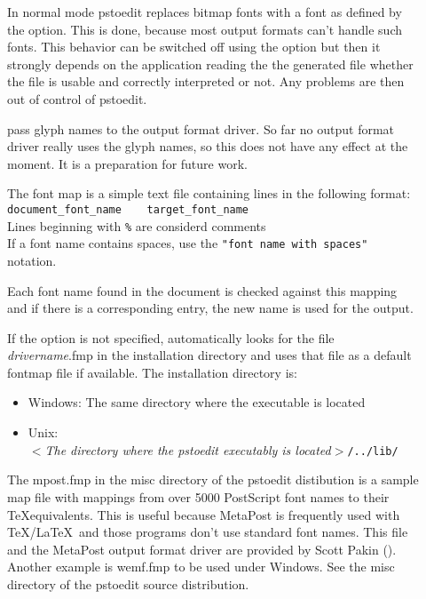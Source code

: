 \documentclass[english,a4paper]{article}
\begin{document}
\begin{description}
\item[] 
In normal mode pstoedit replaces bitmap fonts with a font as defined by the  option. This is done, because most output formats can't handle such fonts. This behavior can be switched off using the  option but then it strongly depends on the application reading the the generated file whether the file is usable and correctly interpreted or not. Any problems are then out of control of pstoedit.


\item[] 
pass glyph names to the output format driver. So far no output format driver really uses the glyph names, so this does not have any effect at the moment. It is a preparation for future work.


\item[] 
The font map is a simple text file containing lines in the following format:\\  
 

\verb+document_font_name    target_font_name+ \\
Lines beginning with \verb+%+ are considerd comments \\
 If a font name contains spaces, use the \verb+"font name with spaces"+ notation. 
 
Each font name found in the document is checked against this mapping and if there is a corresponding entry, the new name is used for the output.  

If  the  option is not specified,  automatically looks for the file \emph{drivername}.fmp in the installation directory and uses that file as a default fontmap file if available. The installation directory is:  

\begin{itemize} 
 
\item Windows: The same directory where the  executable is 
    located  
 
\item Unix: \\ 
$<$\emph{The directory where the pstoedit executably is located}$>$\verb+/../lib/+ 
 
\end{itemize} 
 
The mpost.fmp in the misc directory of the pstoedit distibution is a sample map file with mappings from over 5000 PostScript font names to their \TeX equivalents. This is useful because MetaPost is frequently used with \TeX/\LaTeX\ and those programs don't use standard font names. This file and the MetaPost output format driver are provided by Scott Pakin ().   Another example is wemf.fmp to be used under Windows. See the misc directory of the pstoedit source distribution. 


\end{description}
\end{document}
